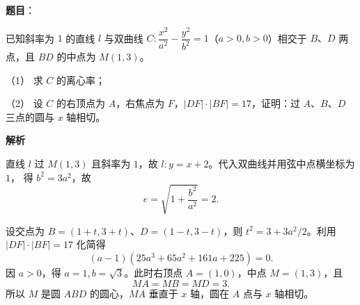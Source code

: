 \begin{answer}

\textbf{题目}：

已知斜率为 $1$ 的直线 $l$ 与双曲线 $C:\dfrac{x^2}{a^2}-\dfrac{y^2}{b^2}=1$（$a>0,b>0$）相交于 $B\text{、}D$ 两点，且 $BD$ 的中点为 $M(1,3)$。

（1） 求 $C$ 的离心率；

（2） 设 $C$ 的右顶点为 $A$，右焦点为 $F$，$|DF|\cdot|BF|=17$，证明：过 $A\text{、}B\text{、}D$ 三点的圆与 $x$ 轴相切。

\textbf{解析}


直线 $l$ 过 $M(1,3)$ 且斜率为 $1$，故 $l:y=x+2$。代入双曲线并用弦中点横坐标为 $1$，
得 $b^2=3a^2$，故
\nopagebreak[4]
\[
e=\sqrt{1+\frac{b^2}{a^2}}=2.
\]


设交点为 $B=(1+t,3+t)$、$D=(1-t,3-t)$，则
$t^2=3+3a^2/2$。利用 $|DF|\cdot|BF|=17$ 化简得
\nopagebreak[4]
\[
(a-1)(25a^3+65a^2+161a+225)=0.
\]
因 $a>0$，得 $a=1,b=\sqrt3$。此时右顶点 $A=(1,0)$，中点 $M=(1,3)$，且
\nopagebreak[4]
\[
MA=MB=MD=3.
\]
所以 $M$ 是圆 $ABD$ 的圆心，$MA$ 垂直于 $x$ 轴，圆在 $A$ 点与 $x$ 轴相切。



\end{answer}
